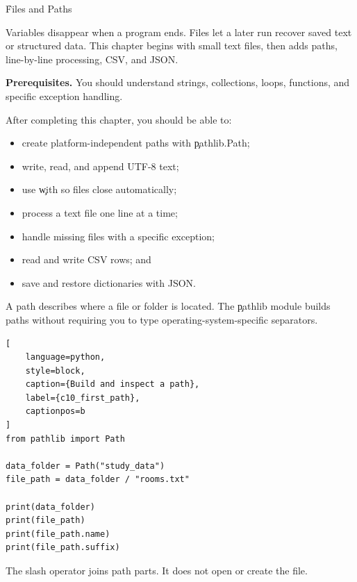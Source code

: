 
\h{Files and Paths}
\label{ch:10}

Variables disappear when a program ends. Files let a later run recover saved
text or structured data. This chapter begins with small text files, then adds
paths, line-by-line processing, CSV, and JSON.

\begin{NoteBox}
\textbf{Prerequisites.} You should understand strings, collections, loops,
functions, and specific exception handling.
\end{NoteBox}

\begin{tcolorbox}[title=Learning outcomes,colframe=orange,colback=white,arc=2mm]
After completing this chapter, you should be able to:
\begin{itemize}
    \item create platform-independent paths with \c{pathlib.Path};
    \item write, read, and append UTF-8 text;
    \item use \c{with} so files close automatically;
    \item process a text file one line at a time;
    \item handle missing files with a specific exception;
    \item read and write CSV rows; and
    \item save and restore dictionaries with JSON.
\end{itemize}
\end{tcolorbox}


A path describes where a file or folder is located. The \c{pathlib} module
builds paths without requiring you to type operating-system-specific separators.

\begin{lstlisting}[
    language=python,
    style=block,
    caption={Build and inspect a path},
    label={c10_first_path},
    captionpos=b
]
from pathlib import Path

data_folder = Path("study_data")
file_path = data_folder / "rooms.txt"

print(data_folder)
print(file_path)
print(file_path.name)
print(file_path.suffix)
\end{lstlisting}

The slash operator joins path parts. It does not open or create the file.

